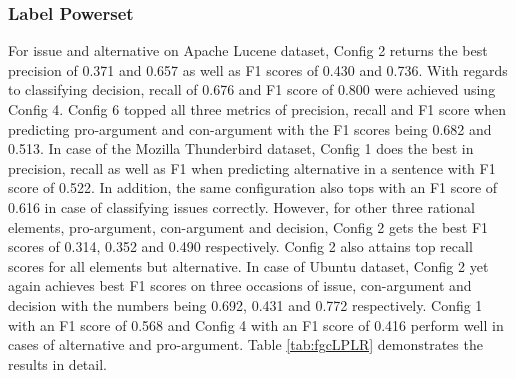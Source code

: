 \documentclass[a4paper,12pt,twoside]{report}
\begin{document}
\subsubsection{Label Powerset}
For issue and alternative on Apache Lucene dataset, Config 2 returns the best precision of 0.371 and 0.657 as well as F1 scores of 0.430 and 0.736. With regards to classifying decision, recall of 0.676 and F1 score of 0.800 were achieved using Config 4. Config 6 topped all three metrics of precision, recall and F1 score when predicting pro-argument and con-argument with the F1 scores being 0.682 and 0.513. In case of the Mozilla Thunderbird dataset, Config 1 does the best in precision, recall as well as F1 when predicting alternative in a sentence with F1 score of 0.522. In addition, the same configuration also tops with an F1 score of 0.616 in case of classifying issues correctly. However, for other three rational elements, pro-argument, con-argument and decision, Config 2 gets the best F1 scores of 0.314, 0.352 and 0.490 respectively. Config 2 also attains top recall scores for all elements but alternative. In case of Ubuntu dataset, Config 2 yet again achieves best F1 scores on three occasions of issue, con-argument and decision with the numbers being 0.692, 0.431 and 0.772 respectively. Config 1 with an F1 score of 0.568 and Config 4 with an F1 score of 0.416 perform well in cases of alternative and pro-argument. Table \ref{tab:fgcLPLR} demonstrates the results in detail.
\end{document}

